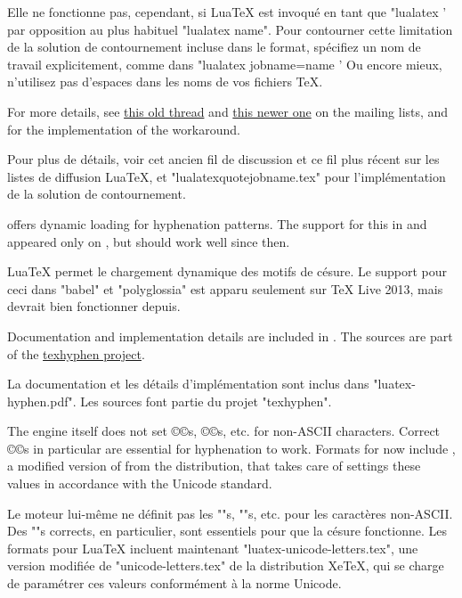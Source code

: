 \documentclass{lltxdoc}
\begin{document}
Elle ne fonctionne pas, cependant, si LuaTeX est invoqué en tant que "lualatex ' par opposition au plus habituel "lualatex name". Pour contourner cette limitation de la solution de contournement incluse dans le format, spécifiez un nom de travail explicitement, comme dans "lualatex jobname=name ' Ou encore mieux, n'utilisez pas d'espaces dans les noms de vos fichiers TeX.

For more details, see
\href{http://www.ntg.nl/pipermail/dev-luatex/2009-April/002549.html}{this old
  thread} and
\href{http://tug.org/pipermail/luatex/2010-August/001986.html}{this newer one}
on the \luatex mailing lists, and  for the
implementation of the workaround.

Pour plus de détails, voir cet ancien fil de discussion et ce fil plus récent sur les listes de diffusion LuaTeX, et "lualatexquotejobname.tex" pour l'implémentation de la solution de contournement.

\luatex offers dynamic loading for hyphenation patterns. The support for this in
 and  appeared only on , but should
work well since then.

LuaTeX permet le chargement dynamique des motifs de césure. Le support pour ceci dans "babel" et "polyglossia" est apparu seulement sur TeX Live 2013, mais devrait bien fonctionner depuis.

Documentation and implementation details are included in
. The sources are part of the
\href{http://tug.org/tex-hyphen/}{texhyphen project}.

La documentation et les détails d'implémentation sont inclus dans "luatex-hyphen.pdf". Les sources font partie du projet "texhyphen".

The engine itself does not set ©\catcode©s, ©\lccode©s, etc. for non-ASCII
characters. Correct ©\lccode©s in particular are essential for hyphenation to
work. Formats for \luatex now include , a
modified version of  from the \xetex distribution,
that takes care of settings these values in accordance with the Unicode
standard.

Le moteur lui-même ne définit pas les "\catcode "s, "\lccode "s, etc. pour les caractères non-ASCII. Des "\lccode "s corrects, en particulier, sont essentiels pour que la césure fonctionne. Les formats pour LuaTeX incluent maintenant "luatex-unicode-letters.tex", une version modifiée de "unicode-letters.tex" de la distribution XeTeX, qui se charge de paramétrer ces valeurs conformément à la norme Unicode.
\end{document}
